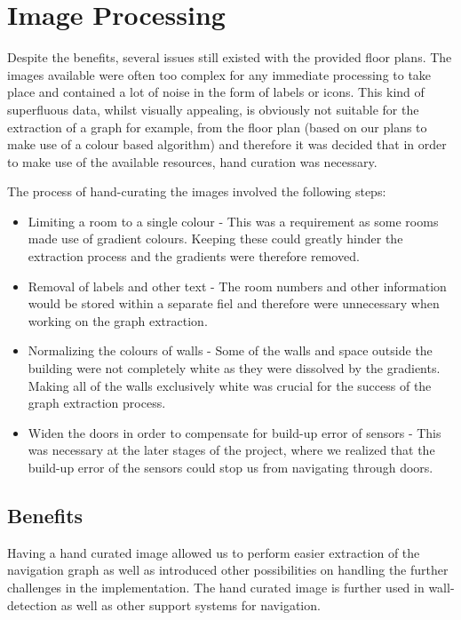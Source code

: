 \documentclass[main.tex]{subfiles}
\begin{document}
\section*{Image Processing}

Despite the benefits, several issues still existed with the provided floor plans. The images available were often too complex for any immediate processing to take place and contained a lot of noise in the form of labels or icons. This kind of superfluous data, whilst visually appealing, is obviously not suitable for the extraction of a graph for example, from the floor plan (based on our plans to make use of a colour based algorithm) and therefore it was decided that in order to make use of the available resources, hand curation was necessary.

The process of hand-curating the images involved the following steps:

\begin{itemize}

\item Limiting a room to a single colour - This was a requirement as some rooms made use of gradient colours. Keeping these could greatly hinder the extraction process and the gradients were therefore removed.

\item Removal of labels and other text - The room numbers and other information would be stored within a separate fiel and therefore were unnecessary when working on the graph extraction.
			
\item Normalizing the colours of walls - Some of the walls and space outside the building were not completely white as they were dissolved by the gradients. Making all of the walls exclusively white was crucial for the success of the graph extraction process.
			
\item Widen the doors in order to compensate for build-up error of sensors - This was necessary at the later stages of the project, where we realized that the build-up error of the sensors could stop us from navigating through doors.
\end{itemize}
		
\subsection*{Benefits}

Having a hand curated image allowed us to perform easier extraction of the navigation graph as well as introduced other possibilities on handling the further challenges in the implementation. The hand curated image is further used in wall-detection as well as other support systems for navigation. 
		
\end{document}
